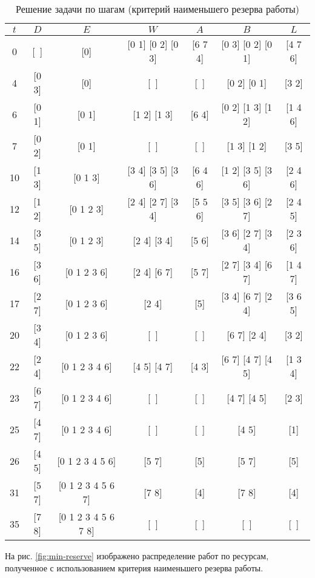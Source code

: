 \begin{table}[H]
	\centering
	\def\tabcolsep{6pt}
	\def\arraystretch{1.3}
	\caption{Решение задачи по шагам (критерий наименьшего резерва работы)}
	\label{tab:min-reserve}
	\begin{tabular}{|c|c|c|c|c|c|c|}
		\hline
		$t$ & $D$ & $E$ & $W$ & $A$ & $B$ & $L$ \\ \hline
		0 & [~] & [0] & [0 1] [0 2] [0 3] & [6 7 4] & [0 3] [0 2] [0 1] & [4 7 6] \\ \hline
		4 & [0 3] & [0] & [~] & [~] & [0 2] [0 1] & [3 2] \\ \hline
		6 & [0 1] & [0 1] & [1 2] [1 3] & [6 4] & [0 2] [1 3] [1 2] & [1 4 6] \\ \hline
		7 & [0 2] & [0 1] & [~] & [~] & [1 3] [1 2] & [3 5] \\ \hline
		10 & [1 3] & [0 1 3] & [3 4] [3 5] [3 6] & [6 4 6] & [1 2] [3 5] [3 6] & [2 4 6] \\ \hline
		12 & [1 2] & [0 1 2 3] & [2 4] [2 7] [3 4] & [5 5 6] & [3 5] [3 6] [2 7] & [2 4 5] \\ \hline
		14 & [3 5] & [0 1 2 3] & [2 4] [3 4] & [5 6] & [3 6] [2 7] [3 4] & [2 3 6] \\ \hline
		16 & [3 6] & [0 1 2 3 6] & [2 4] [6 7] & [5 7] & [2 7] [3 4] [6 7] & [1 4 7] \\ \hline
		17 & [2 7] & [0 1 2 3 6] & [2 4] & [5] & [3 4] [6 7] [2 4] & [3 6 5] \\ \hline
		20 & [3 4] & [0 1 2 3 6] & [~] & [~] & [6 7] [2 4] & [3 2] \\ \hline
		22 & [2 4] & [0 1 2 3 4 6] & [4 5] [4 7] & [4 3] & [6 7] [4 7] [4 5] & [1 3 4] \\ \hline
		23 & [6 7] & [0 1 2 3 4 6] & [~] & [~] & [4 7] [4 5] & [2 3] \\ \hline
		25 & [4 7] & [0 1 2 3 4 6] & [~] & [~] & [4 5] & [1] \\ \hline
		26 & [4 5] & [0 1 2 3 4 5 6] & [5 7] & [5] & [5 7] & [5] \\ \hline
		31 & [5 7] & [0 1 2 3 4 5 6 7] & [7 8] & [4] & [7 8] & [4] \\ \hline
		35 & [7 8] & [0 1 2 3 4 5 6 7 8] & [~] & [~] & [~] & [~] \\ \hline
	\end{tabular}
\end{table}

\newpage

На рис. \ref{fig:min-reserve} изображено распределение работ по ресурсам, полученное с использованием критерия наименьшего резерва работы.

